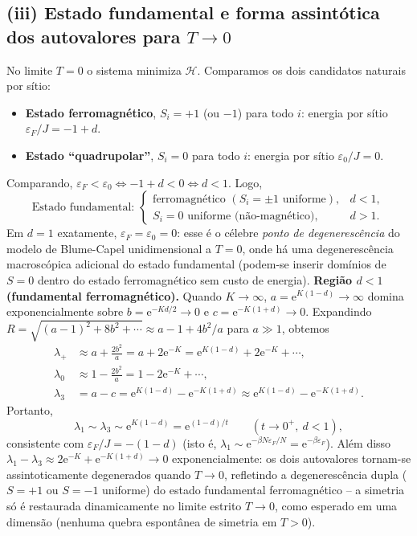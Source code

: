 \documentclass[11pt,a4paper]{article}
\newcommand{\e}[1]{\mathrm{e}^{#1}}
\begin{document}
\subsection*{(iii) Estado fundamental e forma assintótica dos autovalores para $T\to0$}
%
No limite $T=0$ o sistema minimiza $\mathcal H$. Comparamos os dois candidatos naturais por sítio:
%
\begin{itemize}
    \item \textbf{Estado ferromagnético}, $S_i=+1$ (ou $-1$) para todo $i$: energia por sítio $\varepsilon_F/J=-1+d$.
    \item \textbf{Estado ``quadrupolar''}, $S_i=0$ para todo $i$: energia por sítio $\varepsilon_0/J=0$.
\end{itemize}
%
Comparando, $\varepsilon_F<\varepsilon_0 \iff -1+d<0\iff d<1$. Logo,
%
\begin{equation}
    \boxed{
    \text{Estado fundamental: }
    \begin{cases}
        \text{ferromagnético }(S_i=\pm1\text{ uniforme}), & d<1,\\[4pt]
        S_i=0\text{ uniforme (não-magnético)}, & d>1.
    \end{cases}
    }
\end{equation}
%
Em $d=1$ exatamente, $\varepsilon_F=\varepsilon_0=0$: esse é o célebre \emph{ponto de degenerescência} do modelo de Blume-Capel unidimensional a $T=0$, onde há uma degenerescência macroscópica adicional do estado fundamental (podem-se inserir domínios de $S=0$ dentro do estado ferromagnético sem custo de energia).
%
\medskip
%
\noindent\textbf{Região $d<1$ (fundamental ferromagnético).} Quando $K\to\infty$, $a=\e{K(1-d)}\to\infty$ domina exponencialmente sobre $b=\e{-Kd/2}\to0$ e $c=\e{-K(1+d)}\to0$. Expandindo $R=\sqrt{(a-1)^2+8b^2+\cdots}\approx a-1+4b^2/a$ para $a\gg1$, obtemos
%
\begin{align}
    \lambda_+&\approx a+\frac{2b^2}{a}=a+2\e{-K}=\e{K(1-d)}+2\e{-K}+\cdots,\\
    \lambda_0&\approx 1-\frac{2b^2}{a}=1-2\e{-K}+\cdots,\\
    \lambda_3&=a-c=\e{K(1-d)}-\e{-K(1+d)}\approx\e{K(1-d)}-\e{-K(1+d)}.
\end{align}
%
Portanto,
%
\begin{equation}
    \boxed{
    \lambda_1\sim\lambda_3\sim\e{K(1-d)}=\e{(1-d)/t}
    \qquad(t\to0^+,\ d<1),
    }
\end{equation}
%
consistente com $\varepsilon_F/J=-(1-d)$ (isto é, $\lambda_1\sim\e{-\beta N\varepsilon_F/N}=\e{-\beta\varepsilon_F}$). Além disso $\lambda_1-\lambda_3\approx2\e{-K}+\e{-K(1+d)}\to0$ exponencialmente: os dois autovalores tornam-se assintoticamente degenerados quando $T\to0$, refletindo a degenerescência dupla ($S=+1$ ou $S=-1$ uniforme) do estado fundamental ferromagnético -- a simetria só é restaurada dinamicamente no limite estrito $T\to0$, como esperado em uma dimensão (nenhuma quebra espontânea de simetria em $T>0$).
\end{document}

